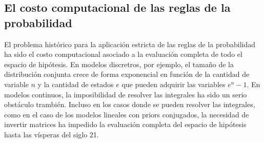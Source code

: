 \documentclass[a4paper,11pt]{book}
\theoremstyle{definition}
\begin{document}
\subsection{El costo computacional de las reglas de la probabilidad}

El problema histórico para la aplicación estricta de las reglas de la probabilidad ha sido el costo computacional asociado a la evaluación completa de todo el espacio de hipótesis.
%
En modelos discretros, por ejemplo, el tamaño de la distribución conjunta crece de forma exponencial en función de la cantidad de variable $n$ y la cantidad de estados $e$ que pueden adquirir las variables $e^n-1$.
%
En modelos continuos, la imposibilidad de resolver las integrales ha sido un serio obstáculo trambién.
%
Incluso en los casos donde se pueden resolver las integrales, como en el caso de los modelos lineales con priors conjugados, la necesidad de invertir matrices ha impedido la evaluación completa del espacio de hipótesis hasta las vísperas del siglo 21.

\end{document}
